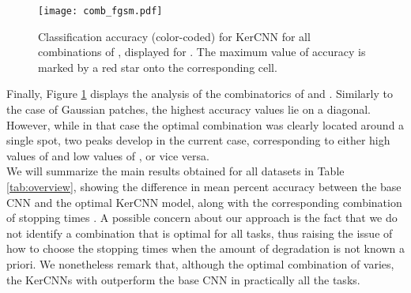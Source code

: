 \documentclass[11pt,oneside,reqno]{amsart}
\begin{document}
  \begin{figure}[htbp!]
  \centering
 \texttt{[image: comb\_fgsm.pdf]}
 \caption{Classification accuracy (color-coded) for KerCNN for all combinations of , displayed for . The maximum value of accuracy is marked by a red star onto the corresponding cell.}\label{comb_fgsm}
 \end{figure}
 Finally, Figure \ref{comb_fgsm} displays the analysis of the combinatorics of  and . Similarly to the case of Gaussian patches, the highest accuracy values lie on a diagonal. However, while in that case the optimal combination was clearly located around a single spot, two peaks develop in the current case, corresponding to either high values of  and low values of , or vice versa.\\

We will summarize the main results obtained for all datasets in Table \ref{tab:overview}, showing the difference in mean percent accuracy between the base CNN and the optimal KerCNN model, along with the corresponding combination of stopping times . A possible concern about our approach is the fact that we do not identify a combination that is optimal for all tasks, thus raising the issue of how to choose the stopping times when the amount of degradation is not known a priori. We nonetheless remark that, although the optimal combination of  varies, the KerCNNs with  outperform the base CNN in practically all the tasks.
 
 \FloatBarrier
 
\end{document}
